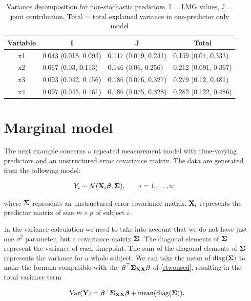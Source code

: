 \documentclass[11pt,a4paper,twoside]{book}
\begin{document}
\begin{table}[h]
\caption{Variance decomposition for non-stochastic predictors. I = LMG values, J = joint contribution, Total = total explained variance in one-predictor only model}
\centering
\begin{tabular}{clll}
  \toprule
  \multicolumn{1}{c}{\textbf{Variable}} & \multicolumn{1}{c}{\textbf{I}} &\multicolumn{1}{c}{\textbf{J}} & \multicolumn{1}{c}{\textbf{Total}} \\
  \hline
x1 & 0.043 (0.018, 0.093)  & 0.117 (0.019, 0.241)   & 0.159 (0.04, 0.333)  \\ 
x2 & 0.067 (0.03, 0.113)  & 0.146 (0.06, 0.256)   & 0.212 (0.091, 0.367)  \\ 
x3 & 0.093 (0.042, 0.156)  & 0.186 (0.076, 0.327)   & 0.279 (0.12, 0.481)  \\ 
x4 & 0.097 (0.045, 0.161)  & 0.186 (0.075, 0.328)   & 0.282 (0.122, 0.486)  \\ 
   \bottomrule
\end{tabular}
\label{tbl:repeatedcormod.tot}
\end{table}



\section{Marginal  model}

The next example concerns a repeated measurement model with time-varying predictors and an unstructured error covariance matrix. The data are generated from the following model:

\begin{align} 
&Y_{i} \sim \mathcal{N}({\mathbf{X}}_{i} {\boldsymbol{\beta}}, {\boldsymbol{\Sigma}}{}), \qquad i = 1, \dots, n
\end{align} 

where ${\boldsymbol{\Sigma}}{}$ represents an unstructured error covariance matrix, ${\mathbf{X}}_{i}$ represents the predictor matrix of size $m \times p$ of subject $i$.

In the variance calculation we need to take into account that we do not have just one $\sigma^2$ parameter, but a covariance matrix ${\boldsymbol{\Sigma}}{}$. The diagonal elements of ${\boldsymbol{\Sigma}}{}$ represent the variance of each timepoint. The sum of the diagonal elements of ${\boldsymbol{\Sigma}}{}$ represents the variance for a whole subject. We can  take the mean of $\operatorname{diag}({\boldsymbol{\Sigma}}{})$ to make the formula compatible with the ${\boldsymbol{\beta}}^\top {\boldsymbol{\Sigma}}{}_{{\mathbf{X}} {\mathbf{X}}}  {\boldsymbol{\beta}}$ of \eqref{rtwoused}, resulting in the total variance term

      \begin{align} 
        \operatorname{Var}({\mathbf{Y}}) = {\boldsymbol{\beta}}^\top {\boldsymbol{\Sigma}}{}_{{\mathbf{X}} {\mathbf{X}}}  {\boldsymbol{\beta}} + \text{mean}(\operatorname{diag}({\boldsymbol{\Sigma}}{})),
   \end{align}
\end{document}
